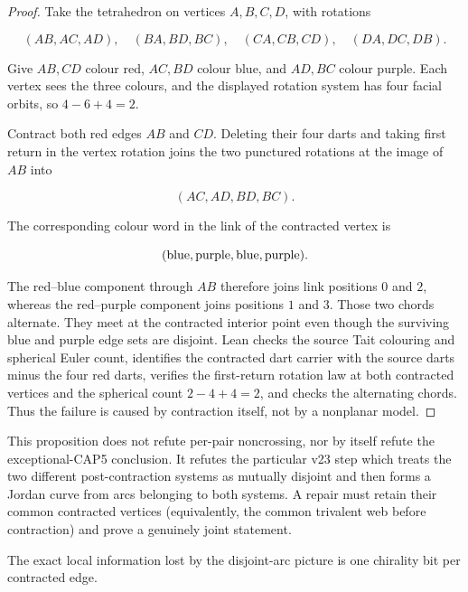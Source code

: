 \begin{proof}
Take the tetrahedron on vertices $A,B,C,D$, with rotations

\[
 (AB,AC,AD),\quad (BA,BD,BC),\quad
 (CA,CB,CD),\quad (DA,DC,DB).
\]

Give $AB,CD$ colour red, $AC,BD$ colour blue, and $AD,BC$
colour purple.  Each vertex sees the three colours, and the displayed
rotation system has four facial orbits, so $4-6+4=2$.

Contract both red edges $AB$ and $CD$.  Deleting their four darts and
taking first return in the vertex rotation joins the two punctured rotations
at the image of $AB$ into

\[
                         (AC,AD,BD,BC).
\]

The corresponding colour word in the link of the contracted vertex is

\[
                    ({\rm blue},{\rm purple},{\rm blue},{\rm purple}).
\]

The red--blue component through $AB$ therefore joins link positions $0$
and $2$, whereas the red--purple component joins positions $1$ and $3$.
Those two chords alternate.  They meet at the contracted interior point even
though the surviving blue and purple edge sets are disjoint.  Lean checks the
source Tait colouring and spherical Euler count, identifies the contracted
dart carrier with the source darts minus the four red darts, verifies the
first-return rotation law at both contracted vertices and the spherical count
$2-4+4=2$, and checks the alternating chords.  Thus the
failure is caused by contraction itself, not by a nonplanar model.
\end{proof}

This proposition does not refute per-pair noncrossing, nor by itself refute
the exceptional-CAP5 conclusion.  It refutes the particular v23 step which
treats the two different post-contraction systems as mutually disjoint and
then forms a Jordan curve from arcs belonging to both systems.  A repair must
retain their common contracted vertices (equivalently, the common trivalent
web before contraction) and prove a genuinely joint statement.

The exact local information lost by the disjoint-arc picture is one chirality
bit per contracted edge.

